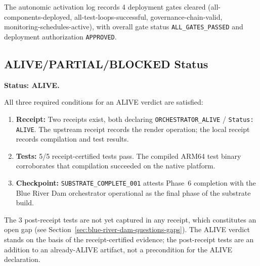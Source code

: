 The autonomic activation log records 4 deployment gates cleared
(all-components-deployed, all-test-loops-successful, governance-chain-valid,
monitoring-schedules-active), with overall gate status
\texttt{ALL\_GATES\_PASSED} and deployment authorization \texttt{APPROVED}.

\subsection{ALIVE/PARTIAL/BLOCKED Status}
\label{sec:blue-river-dam-evidence-status}

\textbf{Status: ALIVE.}

All three required conditions for an ALIVE verdict are satisfied:

\begin{enumerate}
  \item \textbf{Receipt:} Two receipts exist, both declaring
    \texttt{ORCHESTRATOR\_ALIVE} / \texttt{Status: ALIVE}. The upstream receipt
    records the render operation; the local receipt records compilation and
    test results.
  \item \textbf{Tests:} 5/5 receipt-certified tests pass. The compiled ARM64
    test binary corroborates that compilation succeeded on the native platform.
  \item \textbf{Checkpoint:} \texttt{SUBSTRATE\_COMPLETE\_001} attests Phase~6
    completion with the Blue River Dam orchestrator operational as the final
    phase of the substrate build.
\end{enumerate}

The 3 post-receipt tests are not yet captured in any receipt, which constitutes
an open gap (see Section~\ref{sec:blue-river-dam-questions-gaps}). The ALIVE
verdict stands on the basis of the receipt-certified evidence; the post-receipt
tests are an addition to an already-ALIVE artifact, not a precondition for the
ALIVE declaration.
